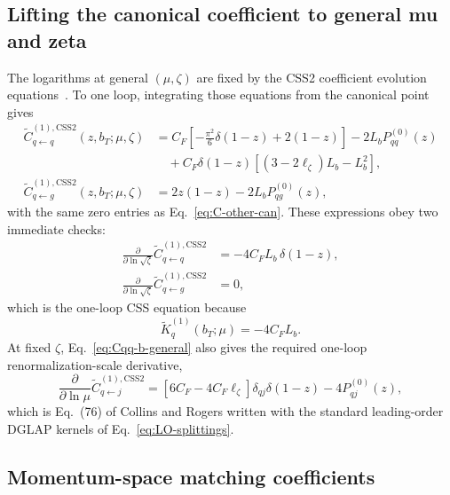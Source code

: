 \documentclass[11pt]{article}
\newcommand{\CSS}{\mathrm{CSS2}}
\begin{document}
\subsection{Lifting the canonical coefficient to general mu and zeta}

The logarithms at general $(\mu,\zeta)$ are fixed by the CSS2 coefficient evolution
equations~\cite{CollinsRogers2017}. To one loop, integrating those equations from the canonical point gives
\begin{align}
  \widetilde C_{q\leftarrow q}^{(1),\CSS}(z,b_T;\mu,\zeta)
  &=
  C_F\left[-\frac{\pi^2}{6}\delta(1-z)+2(1-z)\right]
  -2L_b P_{qq}^{(0)}(z)
  \\
  &\quad
  +C_F\delta(1-z)
  \left[(3-2\ell_\zeta)L_b-L_b^2\right],
  \label{eq:Cqq-b-general}\\
  \widetilde C_{q\leftarrow g}^{(1),\CSS}(z,b_T;\mu,\zeta)
  &=
  2z(1-z)-2L_b P_{qg}^{(0)}(z),
  \label{eq:Cqg-b-general}
\end{align}
with the same zero entries as Eq.~\eqref{eq:C-other-can}. These expressions obey two
immediate checks:
\begin{align}
  \frac{\partial}{\partial\ln\sqrt\zeta}\widetilde C_{q\leftarrow q}^{(1),\CSS}
  &=-4C_F L_b\,\delta(1-z),
  \label{eq:C-zeta-check}\\
  \frac{\partial}{\partial\ln\sqrt\zeta}\widetilde C_{q\leftarrow g}^{(1),\CSS}
  &=0,
\end{align}
which is the one-loop CSS equation because
\begin{equation}
  \widetilde K_q^{(1)}(b_T;\mu)=-4C_F L_b.
  \label{eq:Ktilde-one-loop}
\end{equation}
At fixed $\zeta$, Eq.~\eqref{eq:Cqq-b-general} also gives the required one-loop
renormalization-scale derivative,
\begin{equation}
  \frac{\partial}{\partial\ln\mu}\widetilde C_{q\leftarrow j}^{(1),\CSS}
  =
  \left[6C_F-4C_F\ell_\zeta\right]\delta_{qj}\delta(1-z)
  -4P_{qj}^{(0)}(z),
  \label{eq:C-mu-check}
\end{equation}
which is Eq.~(76) of Collins and Rogers written with the standard leading-order DGLAP
kernels of Eq.~\eqref{eq:LO-splittings}.

\subsection{Momentum-space matching coefficients}
\end{document}
